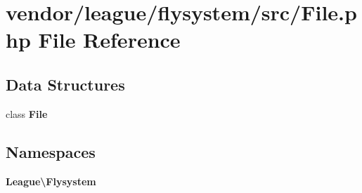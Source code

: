 \section{vendor/league/flysystem/src/\+File.php File Reference}
\label{league_2flysystem_2src_2_file_8php}
\subsection*{Data Structures}
\begin{DoxyCompactItemize}
\item 
class {\bf File}
\end{DoxyCompactItemize}
\subsection*{Namespaces}
\begin{DoxyCompactItemize}
\item 
 {\bf League\textbackslash{}\+Flysystem}
\end{DoxyCompactItemize}
